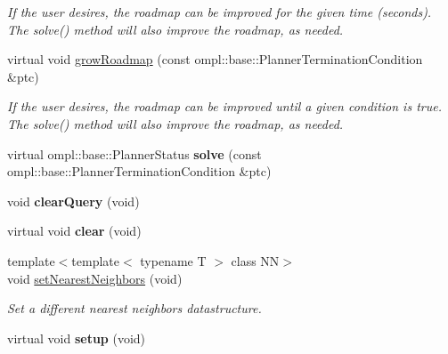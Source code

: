 \begin{DoxyCompactItemize}
\begin{DoxyCompactList}\small\item\em \-If the user desires, the roadmap can be improved for the given time (seconds). \-The solve() method will also improve the roadmap, as needed. \end{DoxyCompactList}\item 
\hypertarget{class_f_i_r_m_aca987eb185a342df77af1d6f4b5719f8}{virtual void \hyperlink{class_f_i_r_m_aca987eb185a342df77af1d6f4b5719f8}{grow\-Roadmap} (const ompl\-::base\-::\-Planner\-Termination\-Condition \&ptc)}\label{class_f_i_r_m_aca987eb185a342df77af1d6f4b5719f8}

\begin{DoxyCompactList}\small\item\em \-If the user desires, the roadmap can be improved until a given condition is true. \-The solve() method will also improve the roadmap, as needed. \end{DoxyCompactList}\item 
\hypertarget{class_f_i_r_m_a4490bf7d770637936f990ee96eeaeb89}{virtual ompl\-::base\-::\-Planner\-Status {\bfseries solve} (const ompl\-::base\-::\-Planner\-Termination\-Condition \&ptc)}\label{class_f_i_r_m_a4490bf7d770637936f990ee96eeaeb89}

\item 
\hypertarget{class_f_i_r_m_acf7c24814ea6b8cad9cad350dea66560}{void {\bfseries clear\-Query} (void)}\label{class_f_i_r_m_acf7c24814ea6b8cad9cad350dea66560}

\item 
\hypertarget{class_f_i_r_m_a0028d56cac8cd7970b77836993a9d6fb}{virtual void {\bfseries clear} (void)}\label{class_f_i_r_m_a0028d56cac8cd7970b77836993a9d6fb}

\item 
\hypertarget{class_f_i_r_m_a8dd7c5ed3fa065f5f37d79bc1d220474}{{\footnotesize template$<$template$<$ typename T $>$ class \-N\-N$>$ }\\void \hyperlink{class_f_i_r_m_a8dd7c5ed3fa065f5f37d79bc1d220474}{set\-Nearest\-Neighbors} (void)}\label{class_f_i_r_m_a8dd7c5ed3fa065f5f37d79bc1d220474}

\begin{DoxyCompactList}\small\item\em \-Set a different nearest neighbors datastructure. \end{DoxyCompactList}\item 
\hypertarget{class_f_i_r_m_a5c5c1fff3029a554dfddfd95bed17b10}{virtual void {\bfseries setup} (void)}\label{class_f_i_r_m_a5c5c1fff3029a554dfddfd95bed17b10}


\end{DoxyCompactItemize}
